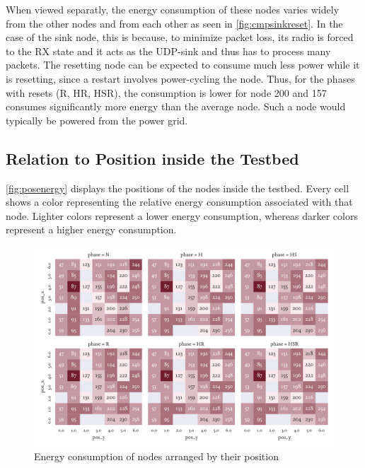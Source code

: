 When viewed separatly, the energy consumption of these nodes varies widely from
the other nodes and from each other as seen in \autoref{fig:cmpsinkreset}. In
the case of the sink node, this is because, to minimize packet loss, its radio
is forced to the \ac{RX} state and it acts as the \ac{UDP}-sink and thus has to
process many packets. The resetting node can be expected to consume much less
power while it is resetting, since a restart involves power-cycling the node.
Thus, for the phases with resets (R, HR, HSR), the consumption is lower for node
200 and 157 consumes significantly more energy than the average node. Such a
node would typically be powered from the power grid.

%
%
%

\subsection{Relation to Position inside the Testbed}

\autoref{fig:posenergy} displays the positions of the nodes inside the testbed.
Every cell shows a color representing the relative energy consumption associated with
that node. Lighter colors represent a lower energy consumption, whereas darker
colors represent a higher energy consumption.

\begin{figure}
  \centering
  \includegraphics[width=0.4\textheight]{../images/consumption-nodes.pdf}
  \caption{Energy consumption of nodes arranged by their position}
  \label{fig:posenergy}
\end{figure}

